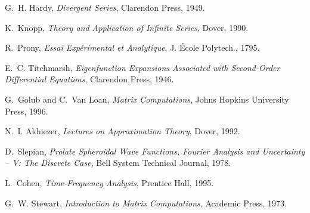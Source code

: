 \documentclass[11pt,a4paper]{article}
\theoremstyle{remark}
\begin{document}
\begin{thebibliography}{9}

G.~H. Hardy, \emph{Divergent Series}, Clarendon Press, 1949.

K.~Knopp, \emph{Theory and Application of Infinite Series}, Dover, 1990.

R.~Prony, \emph{Essai Exp\'erimental et Analytique}, J. \'Ecole Polytech., 1795.

E.~C. Titchmarsh, \emph{Eigenfunction Expansions Associated with Second-Order Differential Equations}, Clarendon Press, 1946.

G.~Golub and C.~Van Loan, \emph{Matrix Computations}, Johns Hopkins University Press, 1996.

N.~I. Akhiezer, \emph{Lectures on Approximation Theory}, Dover, 1992.

D.~Slepian, \emph{Prolate Spheroidal Wave Functions, Fourier Analysis and Uncertainty -- V: The Discrete Case}, Bell System Technical Journal, 1978.

L.~Cohen, \emph{Time-Frequency Analysis}, Prentice Hall, 1995.

G.~W. Stewart, \emph{Introduction to Matrix Computations}, Academic Press, 1973.

\end{thebibliography}
\end{document}
